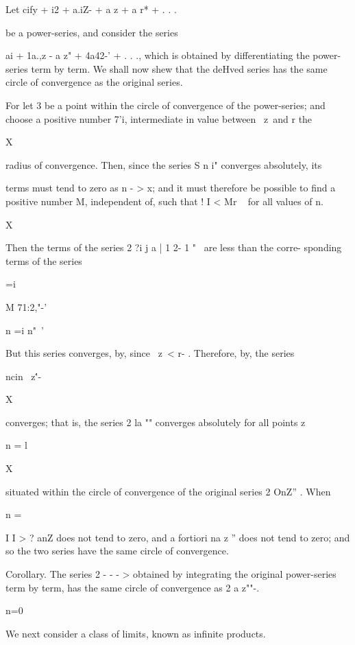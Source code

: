 
Let cify + i2 + a.iZ- + a z + a r* + . . .

be a power-series, and consider the series

ai + 1a.,z - a z" + 4a42-' + . . ., which is obtained by
differentiating the power-series term by term. We shall now shew that
the deHved series has the same circle of convergence as the original
series.

For let 3 be a point within the circle of convergence of the
power-series; and choose a positive number 7'i, intermediate in value
between \ z\ and r the

X

radius of convergence. Then, since the series S n i" converges
absolutely, its

terms must tend to zero as n - > x; and it must therefore be possible
to find a positive number M, independent of, such that ! I < Mr ~ for
all values of n.

 X

Then the terms of the series 2 ?i j a | 1 2- 1 "~ are less than the
corre- sponding terms of the series

 =i

M 71:2,"-'

n =i n"~'

But this series converges, by, since \ z\ < r- . Therefore, by, the series

 ncin \ z\''-

X

converges; that is, the series 2 la "" converges absolutely for all
points z

n = l

X

situated within the circle of convergence of the original series 2
OnZ'' . When

n =

I I > ? anZ does not tend to zero, and a fortiori na z '' does not
tend to zero; and so the two series have the same circle of
convergence.

%
%

Corollary. The series 2 - - - > obtained by integrating the original
power-series term by term, has the same circle of convergence as 2 a
z""-.

n=0


We next consider a class of limits, known as infinite products.


